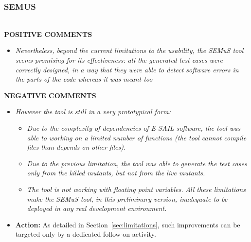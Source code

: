 \subsubsection{SEMUS} \ \\

\textbf{POSITIVE COMMENTS}

\begin{itemize}
\item \emph{Nevertheless, beyond the current limitations to the usability, the SEMuS tool seems promising for its effectiveness: all the generated test cases were correctly designed, in a way that they were able to detect software errors in the parts of the code whereas it was meant too}
\end{itemize}

\textbf{NEGATIVE COMMENTS}
 \begin{itemize}
\item \emph{However the tool is still in a very prototypical form:}
\begin{itemize}
\item \emph{Due to the complexity of dependencies of E-SAIL software, the tool was able to working on a limited number of functions (the tool cannot compile files than depends on other files).}
\item \emph{Due to the previous limitation, the tool was able to generate the test cases only from the killed mutants, but not from the live mutants.}
\item \emph{The tool is not working with floating point variables.}
\emph{All these limitations make the SEMuS tool, in this preliminary version, inadequate to be deployed in any real development environment. }
\end{itemize}
\item \textbf{Action:} As detailed in Section~\ref{sec:limitations}, such improvements can be targeted only by a dedicated follow-on activity.
\end{itemize}
\ENDCHANGEDWPT
